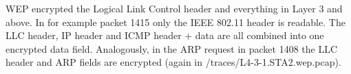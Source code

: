 WEP encrypted the Logical Link Control header and everything in Layer 3 and above. In for example packet 1415 only the IEEE 802.11 header is readable. The LLC header, IP header and ICMP header + data are all combined into one encrypted data field. Analogously, in the ARP request in packet 1408 the LLC header and ARP fields are encrypted (again in /traces/L4-3-1.STA2.wep.pcap).
